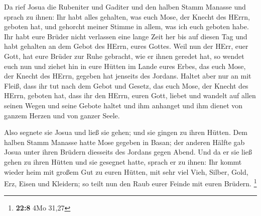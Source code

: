  Da rief Josua die Rubeniter und Gaditer und den halben
Stamm Manasse  und sprach zu ihnen: Ihr habt alles gehalten,
was euch Mose, der Knecht des HErrn, geboten hat, und gehorcht meiner
Stimme in allem, was ich euch geboten habe.  Ihr habt eure
Brüder nicht verlassen eine lange Zeit her bis auf diesen Tag und habt
gehalten an dem Gebot des HErrn, eures Gottes.  Weil nun der
HErr, euer Gott, hat eure Brüder zur Ruhe gebracht, wie er ihnen geredet
hat, so wendet euch nun und ziehet hin in eure Hütten im Lande eures
Erbes, das euch Mose, der Knecht des HErrn, gegeben hat jenseits des
Jordans.  Haltet aber nur an mit Fleiß, dass ihr tut nach
dem Gebot und Gesetz, das euch Mose, der Knecht des HErrn, geboten hat,
dass ihr den HErrn, euren Gott, liebet und wandelt auf allen seinen
Wegen und seine Gebote haltet und ihm anhanget und ihm dienet von ganzem
Herzen und von ganzer Seele.

 Also segnete sie Josua und ließ sie gehen; und sie gingen
zu ihren Hütten.  Dem halben Stamm Manasse hatte Mose
gegeben in Basan; der anderen Hälfte gab Josua unter ihren Brüdern
diesseits des Jordans gegen Abend. Und da er sie ließ gehen zu ihren
Hütten und sie gesegnet hatte,  sprach er zu ihnen: Ihr
kommt wieder heim mit großem Gut zu euren Hütten, mit sehr viel Vieh,
Silber, Gold, Erz, Eisen und Kleidern; so teilt nun den Raub eurer
Feinde mit euren Brüdern. \footnote{\textbf{22:8} 4Mo 31,27}

